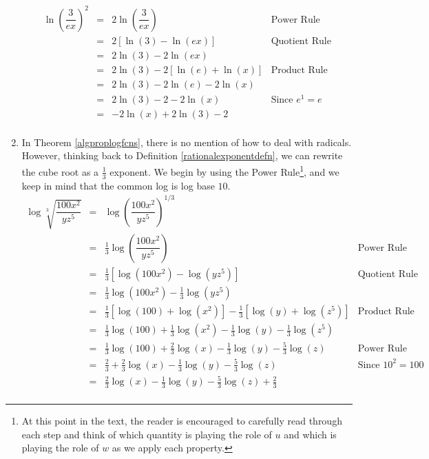 \begin{ex}
\begin{enumerate}
\[\begin{array}{rclr}
\ln \left(\dfrac{3}{ex}\right)^2 & = & 2 \ln \left(\dfrac{3}{ex}\right) & \mbox{Power Rule} \\
                                 & = & 2 \left[ \ln(3) - \ln(ex) \right] & \mbox{Quotient Rule} \\
                                 & = & 2 \ln(3) - 2\ln(ex) & \\
                                 & = & 2 \ln(3) - 2\left[\ln(e) + \ln(x)\right] & \mbox{Product Rule} \\
                                 & = & 2 \ln(3) - 2\ln(e) - 2 \ln(x) & \\
                                 & = & 2\ln(3) - 2 - 2 \ln(x) & \mbox{Since $e^{1} = e$} \\
                                 & = & - 2 \ln(x) + 2\ln(3) - 2 & \\
\end{array}\]
\setlength{\extrarowheight}{2pt}
                        

\item In Theorem \ref{algproplogfcns}, there is no mention of how to deal with radicals.  However, thinking back to Definition \ref{rationalexponentdefn}, we can rewrite the cube root as a $\frac{1}{3}$ exponent.  We begin by using the Power Rule\footnote{At this point in the text, the reader is encouraged to carefully read through each step and think of which quantity is playing the role of $u$ and which is playing the role of $w$ as we apply each property.}, and we keep in mind that the common log is log base $10$. 
\setlength{\extrarowheight}{6pt}
\[ \begin{array}{rclr}

\log \sqrt[3]{\dfrac{100 x^2}{yz^5}} & = & \log \left(\dfrac{100 x^2}{yz^5}\right)^{1/3} & \\ [10pt]
																		& = & \frac{1}{3} \log\left(\dfrac{100 x^2}{yz^5}\right) & \mbox{Power Rule} \\ [5pt]
																		& = & \frac{1}{3} \left[ \log\left(100x^2\right) - \log\left(yz^5\right) \right] & \mbox{Quotient Rule} \\ 
																		& = & \frac{1}{3}\log\left(100x^2\right) - \frac{1}{3}\log\left(yz^5\right) & \\
																		& = & \frac{1}{3}\left[ \log(100) + \log\left(x^2\right)\right] - \frac{1}{3} \left[ \log(y) + \log\left(z^5\right) \right] & \mbox{Product Rule} \\
																		& = & \frac{1}{3} \log(100) + \frac{1}{3} \log\left(x^2\right) - \frac{1}{3} \log(y) - \frac{1}{3} \log\left(z^5\right) \\
																		& = & \frac{1}{3} \log(100) + \frac{2}{3} \log(x) - \frac{1}{3} \log(y) - \frac{5}{3} \log(z) & \mbox{Power Rule} \\
																		& = & \frac{2}{3} + \frac{2}{3} \log(x) - \frac{1}{3} \log(y) - \frac{5}{3} \log(z) & \mbox{Since $10^2=100$} \\
																		& = &  \frac{2}{3} \log(x) - \frac{1}{3} \log(y) - \frac{5}{3} \log(z) + \frac{2}{3} & \\



\end{array}\]
\end{enumerate}
\end{ex}
